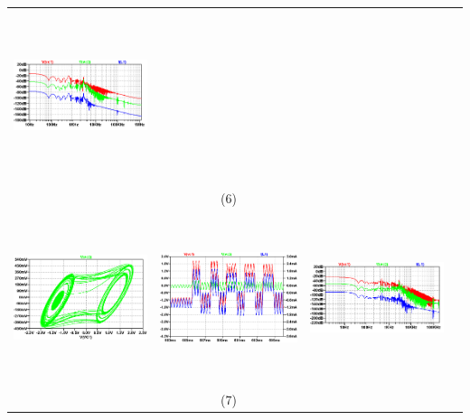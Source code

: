 \documentclass{rbf}
\begin{document}
\begin{table}[h]
\begin{tabular}{c c c c}
        \includegraphics[width=5cm,height=5cm]{r0/ro50.FFT_CAP.png}&\\
        & (6) & \\   
        \includegraphics[width=5cm,height=5cm]{r0/ro56_CAP.png}&
        \includegraphics[width=5cm,height=5cm]{r0/ro56.TS_Cap.png}&
        \includegraphics[width=5cm,height=5cm]{r0/ro56.FFT_CAP.png}&\\
        & (7) & \\
        \hline
    \end{tabular}
\end{table}
\end{document}
